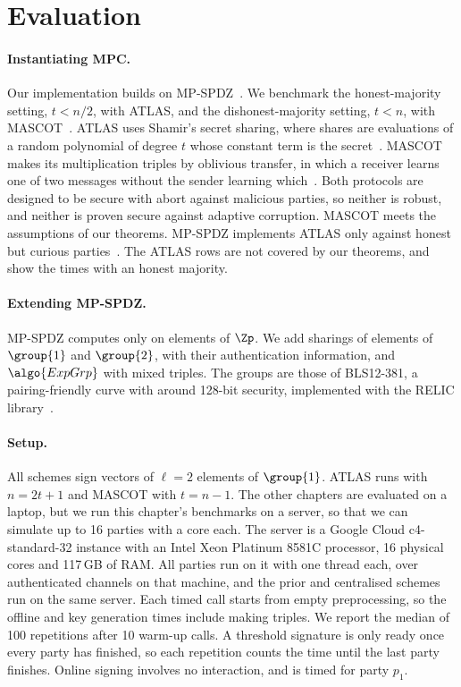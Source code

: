 \section{Evaluation}\label{sec:tsps-evaluation}

\paragraph{Instantiating MPC.} Our implementation builds on
MP-SPDZ~\cite{CCS:Keller20}. We benchmark the honest-majority setting, $t <
n/2$, with ATLAS, and the dishonest-majority setting, $t < n$, with
MASCOT~\cite{C:GLOPS21,CCS:KelOrsSch16}. ATLAS uses Shamir's secret sharing, where
shares are evaluations of a random polynomial of degree $t$ whose constant term is
the secret~\cite{Shamir79}. MASCOT makes its multiplication triples by
oblivious transfer, in which a receiver learns one of two messages without the
sender learning which~\cite{C:EveGolLem82}. Both protocols are designed to be
secure with abort against malicious parties, so neither is robust, and neither
is proven secure against adaptive corruption. MASCOT meets the assumptions of
our theorems. MP-SPDZ implements ATLAS only against honest but curious
parties~\cite{CCS:Keller20}. The ATLAS rows are not covered by our theorems, and
show the times with an honest majority.

\paragraph{Extending MP-SPDZ.} MP-SPDZ computes only on elements of $\Zp$. We
add sharings of elements of $\group{1}$ and $\group{2}$, with their
authentication information, and $\algo{ExpGrp}$ with mixed triples. The groups
are those of BLS12-381, a pairing-friendly curve with around 128-bit security,
implemented with the RELIC library~\cite{relictoolkit}.

\paragraph{Setup.} All schemes sign vectors of $\ell = 2$ elements of
$\group{1}$. ATLAS runs with $n = 2t+1$ and MASCOT with $t = n-1$. The other
chapters are evaluated on a laptop, but we run this chapter's benchmarks on a
server, so that we can simulate up to 16 parties with a core each. The server
is a Google Cloud c4-standard-32 instance with an Intel Xeon Platinum 8581C
processor, 16 physical cores and 117\,GB of RAM. All parties run on it with one
thread each, over authenticated channels on that machine, and the prior and
centralised schemes run on the same server. Each timed call starts from empty
preprocessing, so the offline and key generation times include making triples.
We report the median of 100 repetitions after 10 warm-up calls. A threshold
signature is only ready once every party has finished, so each repetition counts
the time until the last party finishes. Online signing involves no interaction,
and is timed for party $p_1$.

